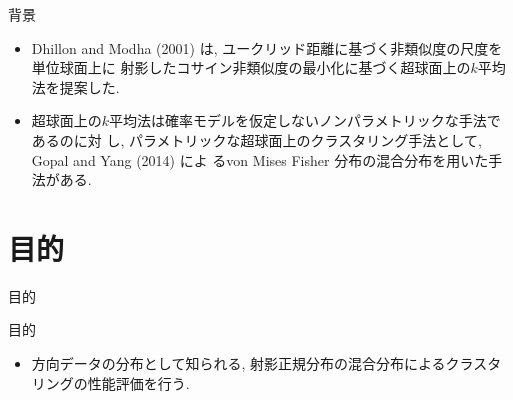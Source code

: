 \documentclass[dvipdfmx]{beamer} %
\begin{document}
\begin{frame}{背景}

\begin{itemize}

\item 
Dhillon and Modha (2001) は, ユークリッド距離に基づく非類似度の尺度を単位球面上に
射影したコサイン非類似度の最小化に基づく超球面上の$k$平均法を提案した.

\item  
超球面上の$k$平均法は確率モデルを仮定しないノンパラメトリックな手法であるのに対
し, パラメトリックな超球面上のクラスタリング手法として, Gopal and Yang (2014) によ
るvon Mises Fisher 分布の混合分布を用いた手法がある.

\end{itemize}

\end{frame}

\section{目的}
\begin{frame}{目的}
\begin{block}{目的}
\begin{itemize}

\item
方向データの分布として知られる, 射影正規分布の混合分布によるクラスタリングの性能評価を行う.

\end{itemize}
\end{block}
\end{frame}

\end{document}
